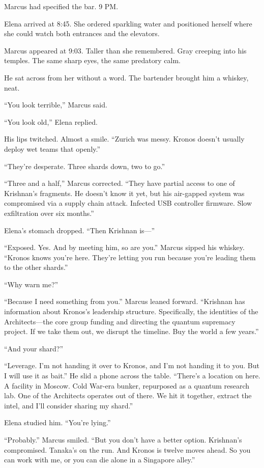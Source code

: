 \documentclass[12pt,oneside]{book}
\begin{document}
Marcus had specified the bar. 9 PM.

Elena arrived at 8:45. She ordered sparkling water and positioned herself where she could watch both entrances and the elevators.

Marcus appeared at 9:03. Taller than she remembered. Gray creeping into his temples. The same sharp eyes, the same predatory calm.

He sat across from her without a word. The bartender brought him a whiskey, neat.

``You look terrible,'' Marcus said.

``You look old,'' Elena replied.

His lips twitched. Almost a smile. ``Zurich was messy. Kronos doesn't usually deploy wet teams that openly.''

``They're desperate. Three shards down, two to go.''

``Three and a half,'' Marcus corrected. ``They have partial access to one of Krishnan's fragments. He doesn't know it yet, but his air-gapped system was compromised via a supply chain attack. Infected USB controller firmware. Slow exfiltration over six months.''

Elena's stomach dropped. ``Then Krishnan is—''

``Exposed. Yes. And by meeting him, so are you.'' Marcus sipped his whiskey. ``Kronos knows you're here. They're letting you run because you're leading them to the other shards.''

``Why warn me?''

``Because I need something from you.'' Marcus leaned forward. ``Krishnan has information about Kronos's leadership structure. Specifically, the identities of the Architects—the core group funding and directing the quantum supremacy project. If we take them out, we disrupt the timeline. Buy the world a few years.''

``And your shard?''

``Leverage. I'm not handing it over to Kronos, and I'm not handing it to you. But I will use it as bait.'' He slid a phone across the table. ``There's a location on here. A facility in Moscow. Cold War-era bunker, repurposed as a quantum research lab. One of the Architects operates out of there. We hit it together, extract the intel, and I'll consider sharing my shard.''

Elena studied him. ``You're lying.''

``Probably.'' Marcus smiled. ``But you don't have a better option. Krishnan's compromised. Tanaka's on the run. And Kronos is twelve moves ahead. So you can work with me, or you can die alone in a Singapore alley.''
\end{document}
